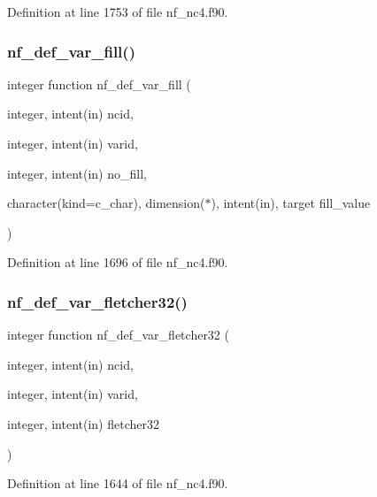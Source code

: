 Definition at line 1753 of file nf\+\_\+nc4.\+f90.

\mbox{\label{nf__nc4_8f90_a104b90b25e029b9b2f5bcacd053ffc18}} 
\subsubsection{\texorpdfstring{nf\+\_\+def\+\_\+var\+\_\+fill()}{nf\_def\_var\_fill()}}
{\footnotesize\ttfamily integer function nf\+\_\+def\+\_\+var\+\_\+fill (\begin{DoxyParamCaption}\item[{integer, intent(in)}]{ncid,  }\item[{integer, intent(in)}]{varid,  }\item[{integer, intent(in)}]{no\+\_\+fill,  }\item[{character(kind=c\+\_\+char), dimension($\ast$), intent(in), target}]{fill\+\_\+value }\end{DoxyParamCaption})}



Definition at line 1696 of file nf\+\_\+nc4.\+f90.

\mbox{\label{nf__nc4_8f90_acf968c8bc0861124e12b9efe97360d45}} 
\subsubsection{\texorpdfstring{nf\+\_\+def\+\_\+var\+\_\+fletcher32()}{nf\_def\_var\_fletcher32()}}
{\footnotesize\ttfamily integer function nf\+\_\+def\+\_\+var\+\_\+fletcher32 (\begin{DoxyParamCaption}\item[{integer, intent(in)}]{ncid,  }\item[{integer, intent(in)}]{varid,  }\item[{integer, intent(in)}]{fletcher32 }\end{DoxyParamCaption})}



Definition at line 1644 of file nf\+\_\+nc4.\+f90.

